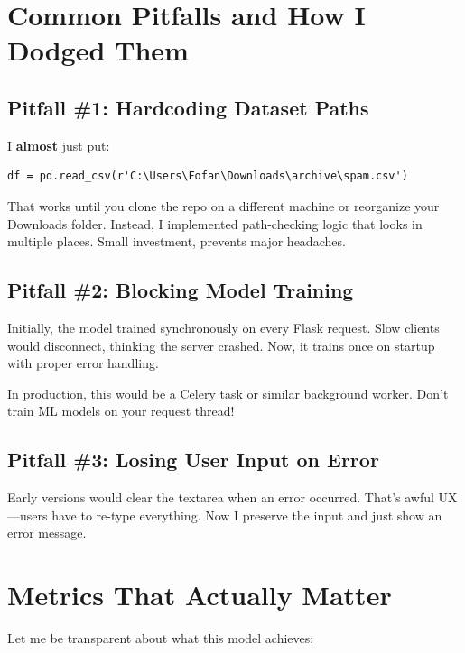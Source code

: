 \documentclass[12pt, a4paper]{article}
\begin{document}
\section{Common Pitfalls and How I Dodged Them}

\subsection{Pitfall \#1: Hardcoding Dataset Paths}

I \textbf{almost} just put:

\begin{verbatim}
df = pd.read_csv(r'C:\Users\Fofan\Downloads\archive\spam.csv')
\end{verbatim}

That works until you clone the repo on a different machine or reorganize your Downloads folder. Instead, I implemented path-checking logic that looks in multiple places. Small investment, prevents major headaches.

\subsection{Pitfall \#2: Blocking Model Training}

Initially, the model trained synchronously on every Flask request. Slow clients would disconnect, thinking the server crashed. Now, it trains once on startup with proper error handling.

\begin{techdetail}
    In production, this would be a Celery task or similar background worker. Don't train ML models on your request thread!
\end{techdetail}

\subsection{Pitfall \#3: Losing User Input on Error}

Early versions would clear the textarea when an error occurred. That's awful UX—users have to re-type everything. Now I preserve the input and just show an error message.

\section{Metrics That Actually Matter}

Let me be transparent about what this model achieves:
\end{document}
